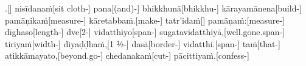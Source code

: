 \documentclass[11pt]{article}
\begin{document}
.[] nisīdanaṁ[sit cloth-] pana[(and)-] bhikkhunā[bhikkhu-] kārayamānena[build-] pamāṇikaṁ[measure-] kāretabbaṁ.[make-] tatr’idaṁ[] pamāṇaṁ:[measure-] dīghaso[length-] dve[2-] vidatthiyo[span-] sugatavidatthiyā,[well.gone.span-] tiriyaṁ[width-] diyaḍḍhaṁ,[1 ½-] dasā[border-] vidatthi.[span-] taṁ[that-] atikkāmayato,[beyond.go-] chedanakaṁ[cut-] pācittiyaṁ.[confess-]  
\endgl
\end{document}
